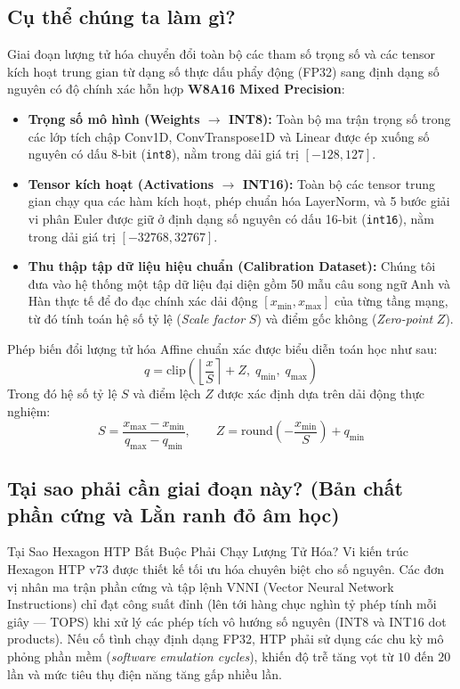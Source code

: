 \documentclass[11pt,a4paper,oneside,table]{report}
\begin{document}
\subsection{Cụ thể chúng ta làm gì?}
Giai đoạn lượng tử hóa chuyển đổi toàn bộ các tham số trọng số và các tensor kích hoạt trung gian từ dạng số thực dấu phẩy động (FP32) sang định dạng số nguyên có độ chính xác hỗn hợp \textbf{W8A16 Mixed Precision}:
\begin{itemize}
    \item \textbf{Trọng số mô hình (Weights $\to$ INT8):} Toàn bộ ma trận trọng số trong các lớp tích chập Conv1D, ConvTranspose1D và Linear được ép xuống số nguyên có dấu 8-bit (\texttt{int8}), nằm trong dải giá trị $[-128, 127]$.
    \item \textbf{Tensor kích hoạt (Activations $\to$ INT16):} Toàn bộ các tensor trung gian chạy qua các hàm kích hoạt, phép chuẩn hóa LayerNorm, và 5 bước giải vi phân Euler được giữ ở định dạng số nguyên có dấu 16-bit (\texttt{int16}), nằm trong dải giá trị $[-32768, 32767]$.
    \item \textbf{Thu thập tập dữ liệu hiệu chuẩn (Calibration Dataset):} Chúng tôi đưa vào hệ thống một tập dữ liệu đại diện gồm 50 mẫu câu song ngữ Anh và Hàn thực tế để đo đạc chính xác dải động $[x_{\min}, x_{\max}]$ của từng tầng mạng, từ đó tính toán hệ số tỷ lệ (\textit{Scale factor} $S$) và điểm gốc không (\textit{Zero-point} $Z$).
\end{itemize}

Phép biến đổi lượng tử hóa Affine chuẩn xác được biểu diễn toán học như sau:
\begin{equation}
    q = \text{clip}\left(\left\lfloor \frac{x}{S} \right\rceil + Z, \; q_{\min}, \; q_{\max}\right)
    \label{eq:quant_affine}
\end{equation}
Trong đó hệ số tỷ lệ $S$ và điểm lệch $Z$ được xác định dựa trên dải động thực nghiệm:
\begin{equation}
    S = \frac{x_{\max} - x_{\min}}{q_{\max} - q_{\min}}, \qquad Z = \text{round}\left(- \frac{x_{\min}}{S}\right) + q_{\min}
\end{equation}

\subsection{Tại sao phải cần giai đoạn này? (Bản chất phần cứng và Lằn ranh đỏ âm học)}

\begin{technicalbox}{Tại Sao Hexagon HTP Bắt Buộc Phải Chạy Lượng Tử Hóa?}
Vi kiến trúc Hexagon HTP v73 được thiết kế tối ưu hóa chuyên biệt cho số nguyên. Các đơn vị nhân ma trận phần cứng và tập lệnh VNNI (Vector Neural Network Instructions) chỉ đạt công suất đỉnh (lên tới hàng chục nghìn tỷ phép tính mỗi giây --- TOPS) khi xử lý các phép tích vô hướng số nguyên (INT8 và INT16 dot products). Nếu cố tình chạy định dạng FP32, HTP phải sử dụng các chu kỳ mô phỏng phần mềm (\textit{software emulation cycles}), khiến độ trễ tăng vọt từ $10$ đến $20$ lần và mức tiêu thụ điện năng tăng gấp nhiều lần.
\end{technicalbox}
\end{document}
